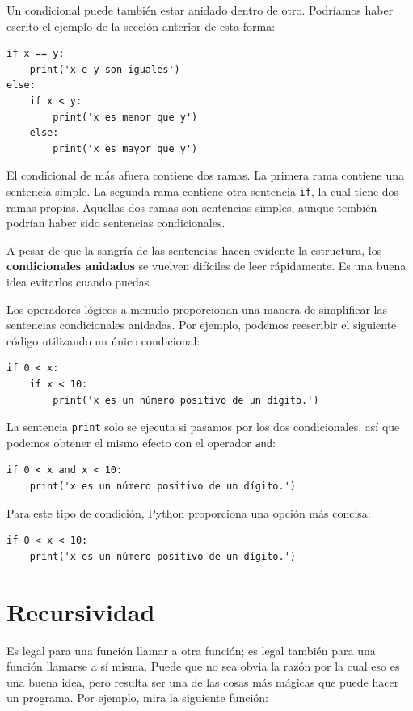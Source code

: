 \documentclass[10pt]{book}
\begin{document}
Un condicional puede también estar anidado dentro de otro.  Podríamos haber
escrito el ejemplo de la sección anterior de esta forma:

\begin{verbatim}
if x == y:
    print('x e y son iguales')
else:
    if x < y:
        print('x es menor que y')
    else:
        print('x es mayor que y')
\end{verbatim}
%
El condicional de más afuera contiene dos ramas.  La
primera rama contiene una sentencia simple.  La segunda rama
contiene otra sentencia {\tt if}, la cual tiene dos ramas
propias.  Aquellas dos ramas son sentencias simples,
aunque tembién podrían haber sido sentencias condicionales.

A pesar de que la sangría de las sentencias hacen evidente la
estructura, los {\bf condicionales anidados} se vuelven difíciles de leer
rápidamente.  Es una buena idea evitarlos cuando puedas.

Los operadores lógicos a menudo proporcionan una manera de simplificar las sentencias condicionales
anidadas.  Por ejemplo, podemos reescribir el siguiente código utilizando un
único condicional:

\begin{verbatim}
if 0 < x:
    if x < 10:
        print('x es un número positivo de un dígito.')
\end{verbatim}
%
La sentencia {\tt print} solo se ejecuta si pasamos por los dos
condicionales, así que podemos obtener el mismo efecto con el operador {\tt and}:

\begin{verbatim}
if 0 < x and x < 10:
    print('x es un número positivo de un dígito.')
\end{verbatim}

Para este tipo de condición, Python proporciona una opción más concisa:

\begin{verbatim}
if 0 < x < 10:
    print('x es un número positivo de un dígito.')
\end{verbatim}


\section{Recursividad}
\label{recursion}

Es legal para una función llamar a otra función;
es legal también para una función llamarse a sí misma.  Puede que no sea obvia
la razón por la cual eso es una buena idea, pero resulta ser una de las cosas más
mágicas que puede hacer un programa.
Por ejemplo, mira la siguiente función:
\end{document}
